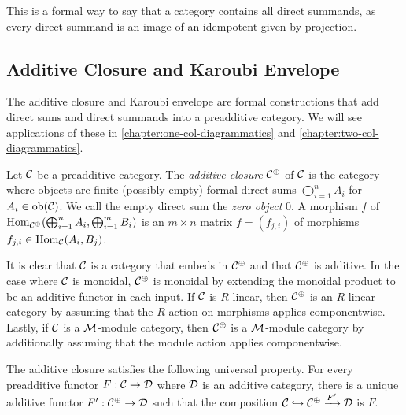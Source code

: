This is a formal way to say that a category contains all direct summands, as every direct summand is an image of an idempotent given by projection.




\subsection*{Additive Closure and Karoubi Envelope}

The additive closure and Karoubi envelope are formal constructions that add direct sums and direct summands into a preadditive category. We will see applications of these in \autoref{chapter:one-col-diagrammatics} and \autoref{chapter:two-col-diagrammatics}.

\begin{definition}
    Let $\mathcal{C}$ be a preadditive category. The \textit{additive closure} $\mathcal{C}^\oplus$ of $\mathcal{C}$ is the category where objects are finite (possibly empty) formal direct sums $\bigoplus_{i=1}^n A_i$ for $A_i \in \operatorname{ob}(\mathcal{C})$. We call the empty direct sum the \textit{zero object} $0$. A morphism $f$ of $\operatorname{Hom}_{\mathcal{C}^\oplus}(\bigoplus_{i=1}^n A_i, \bigoplus_{i=1}^m B_i)$ is an $m \times n$ matrix $f = (f_{j,i})$ of morphisms $f_{j,i} \in \operatorname{Hom}_{\mathcal{C}}(A_i, B_j)$.
\end{definition}

It is clear that $\mathcal{C}$ is a category that embeds in $\mathcal{C}^\oplus$ and that $\mathcal{C}^\oplus$ is additive. In the case where $\mathcal{C}$ is monoidal, $\mathcal{C}^\oplus$ is monoidal by extending the monoidal product to be an additive functor in each input. If $\mathcal{C}$ is $R$-linear, then $\mathcal{C}^\oplus$ is an $R$-linear category by assuming that the $R$-action on morphisms applies componentwise. Lastly, if $\mathcal{C}$ is a $\mathcal{M}$-module category, then $\mathcal{C}^\oplus$ is a $\mathcal{M}$-module category by additionally assuming that the module action applies componentwise.

\begin{lemma}
    The additive closure satisfies the following universal property. For every preadditive functor $F: \mathcal{C} \to \mathcal{D}$ where $\mathcal{D}$ is an additive category, there is a unique additive functor $F': \mathcal{C}^\oplus \to \mathcal{D}$ such that the composition $\mathcal{C} \hookrightarrow \mathcal{C}^\oplus \xrightarrow{F'} \mathcal{D}$ is $F$.
\end{lemma}

